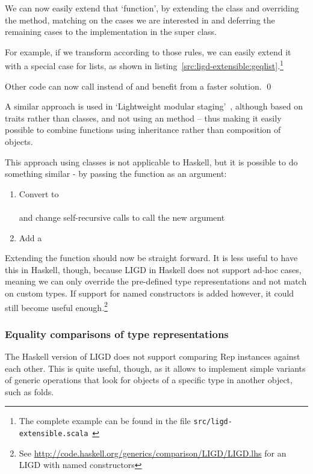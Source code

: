 We can now easily extend that `function', by extending the class and overriding
the  method, matching on the cases we are interested in and deferring the
remaining cases to the implementation in the super class.

\begin{example}
For example, if we transform  according to those rules, we can
easily extend it with a special case for lists, as shown in listing~\ref{src:ligd-extensible:geqlist}.\footnote{The complete example can be found in
the  file \texttt{src/ligd-extensible.scala}~\cite{src}}

Other code can now call  instead of  and benefit from a
faster solution. \qed
\end{example}
A similar approach is used in `Lightweight modular staging'~\cite{DBLP:conf/gpce/RompfO10}\cite{DBLP:journals/cacm/RompfO12},
although based on traits rather than classes, and not using an 
method -- thus making it easily possible to combine functions using inheritance
rather than composition of objects.

This approach using classes is not applicable to Haskell, but it is possible
to do something similar - by passing the function as an argument:
\begin{enumerate}
  \item Convert  to \\
        \hphantom{Convert } \\
        and change self-recursive calls to call the new argument
  \item Add a  
\end{enumerate}

Extending the function should now be straight forward. It is less useful to
have this in Haskell, though, because LIGD in Haskell does not support ad-hoc
cases, meaning we can only override the pre-defined type representations and not
match on custom types. If support for named constructors is added however, it
could still become useful enough.\footnote{See \url{http://code.haskell.org/generics/comparison/LIGD/LIGD.lhs} for an LIGD with named constructors}

\subsubsection{Equality comparisons of type representations}
The Haskell version of LIGD does not support comparing Rep instances
against each other. This is quite useful, though, as it allows to
implement simple variants of generic operations that look for objects
of a specific type in another object, such as folds.

